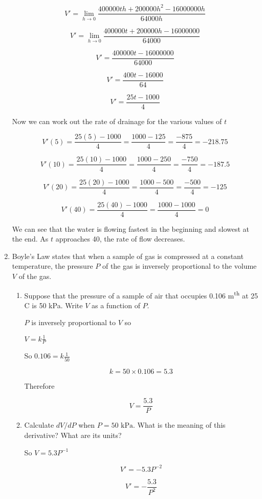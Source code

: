\documentclass{article}
\begin{document}
\begin{enumerate}
	$$V' = \lim _{h \to 0} \frac{400000th + 200000h^2 - 16000000h}{64000h}$$

	$$V' = \lim _{h \to 0} \frac{400000t + 200000h - 16000000}{64000}$$

	$$V' = \frac{400000t - 16000000}{64000}$$

	$$V' = \frac{400t - 16000}{64}$$

	$$V' = \frac{25t - 1000}{4}$$

	Now we can work out the rate of drainage for the various values of $t$

	$$V'(5) = \frac{25(5) - 1000}{4} = \frac{1000 - 125}{4} = \frac{-875}{4} = - 218.75$$

	$$V'(10) = \frac{25(10) - 1000}{4} = \frac{1000 - 250}{4} = \frac{-750}{4} = - 187.5$$

	$$V'(20) = \frac{25(20) - 1000}{4} = \frac{1000 - 500}{4} = \frac{-500}{4} = - 125$$

	$$V'(40) = \frac{25(40) - 1000}{4} = \frac{1000 - 1000}{4} = 0$$

	We can see that the water is flowing fastest in the beginning and slowest at the end. As
	$t$ approaches 40, the rate of flow decreases.

		\item Boyle's Law states that when a sample of gas is compressed at a constant
			temperature, the pressure $P$ of the gas is inversely proportional to the
			volume $V$ of the gas.

		\begin{enumerate}
			\item Suppose that the pressure of a sample of air that occupies 
				0.106 m\textsuperscript{th} at 25 \degree C is 50 kPa. Write $V$ as
				a function of $P$.

				$P$ is inversely proportional to $V$ so

				$V = k\frac{1}{P}$ 

				So $0.106 = k\frac{1}{50}$

				$$k = 50 \times 0.106 = 5.3$$

				Therefore

				$$V = \frac{5.3}{P}$$

			\item Calculate $dV/dP$ when $P = 50 \text{ kPa}$. What is the meaning of this
				derivative? What are its units?

				So $V = 5.3P^{-1}$

				$$V' = -5.3P^{-2}$$

				$$V' = - \frac{5.3}{P^2}$$


\end{enumerate}
\end{enumerate}
\end{document}
